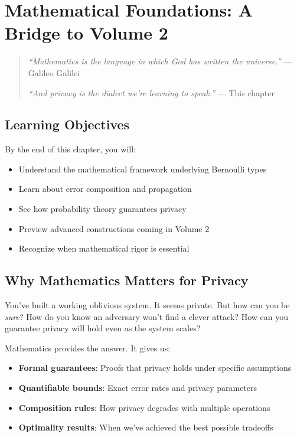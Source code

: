 \chapter{Mathematical Foundations: A Bridge to Volume 2}
\label{ch:mathematical-bridge}

\begin{quote}
\textit{``Mathematics is the language in which God has written the universe.''} — Galileo Galilei

\textit{``And privacy is the dialect we're learning to speak.''} — This chapter
\end{quote}

\section*{Learning Objectives}
By the end of this chapter, you will:
\begin{itemize}
\item Understand the mathematical framework underlying Bernoulli types
\item Learn about error composition and propagation
\item See how probability theory guarantees privacy
\item Preview advanced constructions coming in Volume 2
\item Recognize when mathematical rigor is essential
\end{itemize}

\section{Why Mathematics Matters for Privacy}

You've built a working oblivious system. It seems private. But how can you be \textit{sure}? How do you know an adversary won't find a clever attack? How can you guarantee privacy will hold even as the system scales?

Mathematics provides the answer. It gives us:
\begin{itemize}
\item \textbf{Formal guarantees}: Proofs that privacy holds under specific assumptions
\item \textbf{Quantifiable bounds}: Exact error rates and privacy parameters
\item \textbf{Composition rules}: How privacy degrades with multiple operations
\item \textbf{Optimality results}: When we've achieved the best possible tradeoffs
\end{itemize}

